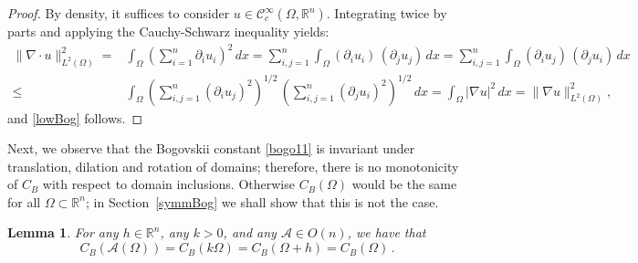 \documentclass[11pt]{article}
\theoremstyle{plain}
\newtheorem{lemma}[theorem]{Lemma}
\theoremstyle{definition}
\numberwithin{equation}{section}
\newcommand{\R}{\mathbb{R}}
\begin{document}
\noindent
\begin{proof} By density, it suffices to consider $u\in \mathcal{C}^\infty_c(\Omega, \mathbb{R}^{n})$.
Integrating twice by parts and applying the Cauchy-Schwarz inequality yields:
\begin{align*}
\| \nabla \cdot u\|^2_{L^2(\Omega )}
=&\int_\Omega \left(\sum_{i=1}^n \partial_i u_{i}\right)^2 \, dx
=\sum_{i,j=1}^n \int_\Omega \left( \partial_i u_{i}\right) \, \left( \partial_j u_{j}\right)\, dx
=\sum_{i,j=1}^n \int_\Omega \left( \partial_i u_{j}\right) \, \left( \partial_j u_{i}\right)\, dx\\
\le&  \int_\Omega \left( \sum_{i,j=1}^n(\partial_i u_{j})^2\right)^{1/2} \, \left(\sum_{i,j=1}^n (\partial_j u_{i})^2\right)^{1/2}\, dx
= \int_\Omega |\nabla u |^2 \, dx= \| \nabla u\|^2_{L^2(\Omega )},
\end{align*}
and \eqref{lowBog} follows.	
\end{proof}

Next, we observe that the Bogovskii constant \eqref{bogo11} is invariant under translation, dilation and rotation of domains; therefore,
there is no monotonicity of $C_B$ with respect to domain inclusions. Otherwise $C_B(\Omega)$ would be the same for all $\Omega\subset \R^n$; in Section~\ref{symmBog} we shall show that this is not the case.

\begin{lemma}\label{invariance}
	For  any $h\in\R^n$, any $k>0$, and any $\mathcal{A}\in O(n)$, we have that
	$$
	C_B(\mathcal{A}(\Omega))=C_B(k\Omega)=C_B(\Omega+h)=C_B(\Omega)\, .
	$$
\end{lemma}
\end{document}
